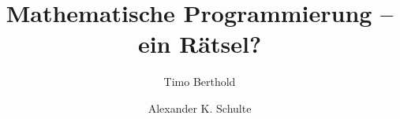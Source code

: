 \documentclass[envcountsame,envcountchap,deutsch]{svmono}
\begin{document}
\author{Timo Berthold \and Alexander K. Schulte}
\title{Mathematische Programmierung -- ein Rätsel?}
\maketitle

\frontmatter%

%
%

\tableofcontents


\mainmatter%






%
%

\backmatter%
%
%
\printindex

\end{document}
